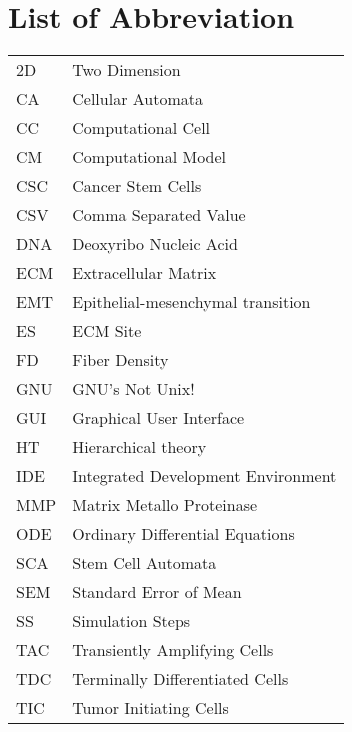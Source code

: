 \chapter*{List of Abbreviation}

\begin{tabular}{  l l    }
2D    &      Two Dimension\\
CA    &      Cellular Automata\\
CC    &      Computational Cell\\
CM    &      Computational Model\\
CSC    &      Cancer Stem Cells\\
CSV	&	Comma Separated Value\\
DNA	&	Deoxyribo Nucleic Acid\\
ECM    &      Extracellular Matrix\\    
EMT	&	Epithelial-mesenchymal transition\\
ES    &      ECM Site\\
FD     &      Fiber Density\\
GNU     &      GNU's Not Unix!\\
GUI     &      Graphical User Interface\\
HT	&	Hierarchical theory\\
IDE 	&	Integrated Development Environment \\
MMP    &     Matrix Metallo Proteinase\\
ODE    &     Ordinary Differential Equations\\        
SCA	&	Stem Cell Automata\\
SEM    &     Standard Error of Mean\\
SS    &      Simulation Steps\\        
TAC    &     Transiently Amplifying Cells\\
TDC    &     Terminally Differentiated Cells\\        
TIC    &      Tumor Initiating Cells\\
\end{tabular}


